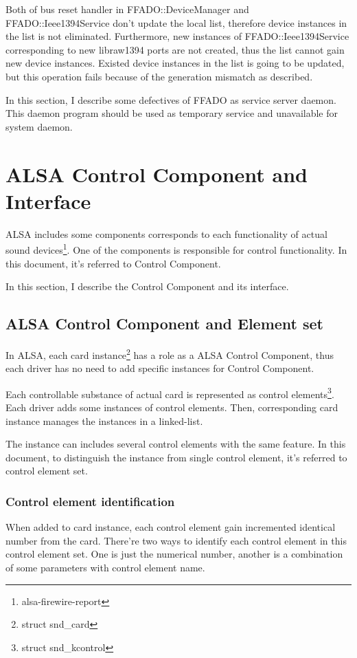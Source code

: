 \documentclass[onecolumn]{article}
\begin{document}
Both of bus reset handler in FFADO::DeviceManager and FFADO::Ieee1394Service don't update the local list, therefore device instances in the list is not eliminated. Furthermore, new instances of FFADO::Ieee1394Service corresponding to new libraw1394 ports are not created, thus the list cannot gain new device instances. Existed device instances in the list is going to be updated, but this operation fails because of the generation mismatch as described.


In this section, I describe some defectives of FFADO as service server daemon. This daemon program should be used as temporary service and unavailable for system daemon.


\section{ALSA Control Component and Interface}

ALSA includes some components corresponds to each functionality of actual sound devices\footnote{alsa-firewire-report}. One of the components is responsible for control functionality. In this document, it's referred to Control Component.

In this section, I describe the Control Component and its interface.


\subsection{ALSA Control Component and Element set}

In ALSA, each card instance\footnote{struct snd\_card} has a role as a ALSA Control Component, thus each driver has no need to add specific instances for Control Component.

Each controllable substance of actual card is represented as control elements\footnote{struct snd\_kcontrol}. Each driver adds some instances of control elements. Then, corresponding card instance manages the instances in a linked-list.

The instance can includes several control elements with the same feature. In this document, to distinguish the instance from single control element, it's referred to control element set.


\subsubsection{Control element identification}

When added to card instance, each control element gain incremented identical number from the card. There're two ways to identify each control element in this control element set. One is just the numerical number, another is a combination of some parameters with control element name.
\end{document}
